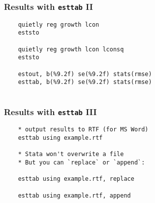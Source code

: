 \begin{frame}[fragile]
	\small 
	\frametitle{Results with \texttt{esttab} II}
	\begin{verbatim}
	quietly reg growth lcon
	eststo
	
	quietly reg growth lcon lconsq
	eststo
	
	estout, b(%9.2f) se(%9.2f) stats(rmse)
	esttab, b(%9.2f) se(%9.2f) stats(rmse)
	
	\end{verbatim}
\end{frame}

\begin{frame}[fragile]
	\small 
	\frametitle{Results with \texttt{esttab} III}
	\begin{verbatim}
	* output results to RTF (for MS Word)
	esttab using example.rtf
	
	* Stata won't overwrite a file
	* But you can `replace` or `append`:
	
	esttab using example.rtf, replace
	
	esttab using example.rtf, append
	
	\end{verbatim}
\end{frame}



\appendix
\frame{}


